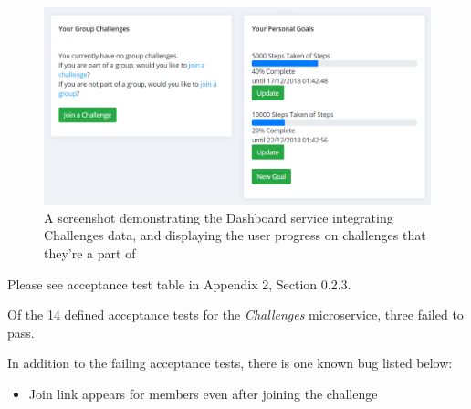 \begin{figure}[H]
    \centering
    \includegraphics[width=\textwidth]{Images/service_challenges.png}
    \caption{A screenshot demonstrating the Dashboard service integrating Challenges data, and displaying the user progress on challenges that they're a part of}
\end{figure}

Please see acceptance test table in Appendix 2, Section 0.2.3.

Of the 14 defined acceptance tests for the \textit{Challenges} microservice, three failed to pass. 

In addition to the failing acceptance tests, there is one known bug listed below:

\begin{itemize}
	\item Join link appears for members even after joining the challenge
\end{itemize}